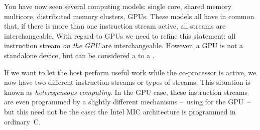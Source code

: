 
You have now seen several computing models: single core, shared memory
multicore, distributed memory clusters, GPUs. These models all have in
common that, if there is more than one instruction stream active, all
streams are interchangeable. With regard to GPUs we need to refine this
statement: all instruction stream \emph{on the GPU} are
interchangeable. However, a GPU is not a standalone device, but can be
considered a  to a . 

If we want to let the host perform useful work while the co-processor
is active, we now have two different instruction streams or types of
streams. This situation is known as \emph{heterogeneous computing}.
In the GPU case, these instruction streams are even
programmed by a slightly different mechanisms --~using
 for the GPU~-- but this need not be the case: the
 Intel \acf{MIC} architecture is programmed in
ordinary~C.

